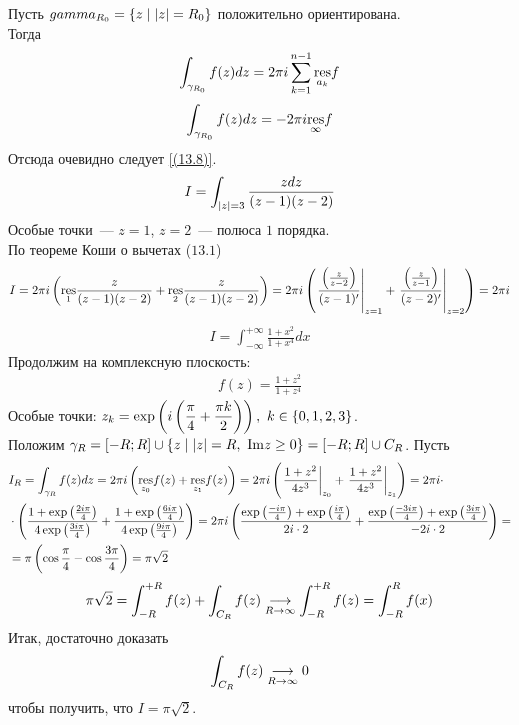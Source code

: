 Пусть $gamma_{R_0} = \{z \mid \left|{z}\right| = R_0\}$ положительно ориентирована.
\\
Тогда
\begin{align*}
  \int_{\gamma_{R_0}}f(z)dz = 2 \pi i \sum_{k=1}^{n-1} \underset{a_k}{\mathrm{res}}f
\end{align*}
\begin{align*}
  \int_{\gamma_{R_0}}f(z)dz = -2 \pi i \underset{\infty}{\mathrm{res}}f
\end{align*}
Отсюда очевидно следует \eqref{(13.8)}.
\Example
\begin{align*}
  I = \int_{\left|{z}\right| = 3}\frac{z dz}{(z-1)(z-2)}
\end{align*}
Особые точки~--- $z=1$, $z=2$~--- полюса $1$ порядка.
\\
По теореме Коши о вычетах ($13.1$)
\begin{align*}
  I = 2 \pi i \left( \underset{1}{\mathrm{res}} \frac{z}{(z-1)(z-2)} +  \underset{2}{\mathrm{res}} \frac{z}{(z-1)(z-2)}\right) = 2 \pi i \left( \left. \frac{\left( \frac{z}{z-2} \right)}{(z-1)'} \right|_{z=1} +  \left. \frac{\left( \frac{z}{z-1} \right)}{(z-2)'} \right|_{z=2} \right) = 2 \pi i
\end{align*}
\Example
\begin{align*}
  I = \int_{-\infty}^{+\infty}\frac{1+x^2}{1+x^4}dx
\end{align*}
Продолжим на комплексную плоскость:
\begin{align*}
  f(z) = \frac{1+z^2}{1+z^4}
\end{align*}
Особые точки: $z_k = \exp \left( i \left( \displaystyle \frac{\pi}{4} + \displaystyle \frac{\pi
          k}{2} \right) \right), \ k \in\{0, 1, 2, 3\}$.
\\
Положим $\gamma_R = \left[ -R;R \right] \cup \{z \mid \left|{z}\right| = R, \ \mathrm{Im} z \geq
0 \} = \left[ -R;R \right] \cup C_R$.
Пусть 
\begin{align*}
  & I_R = \int_{\gamma_R}f(z)dz = 2 \pi i \left( \underset{z_0}{\mathrm{res}} f(z) +  \underset{z_1}{\mathrm{res}} f(z)\right) = 2 \pi i \left( \left.\frac{1+z^2}{4z^3}\right|_{z_0} + \left.\frac{1+z^2}{4z^3}\right|_{z_1}\right) = 2 \pi i \cdot \\
  & \cdot \left( \frac{1+\exp\left( \frac{2i \pi}{4} \right)}{4 \exp \left( \frac{3i \pi}{4} \right)} +  \frac{1+\exp\left( \frac{6i \pi}{4} \right)}{4 \exp \left( \frac{9i \pi}{4} \right)}\right) = 2 \pi i \left( \frac{\exp\left( \frac{-i\pi}{4} \right) + \exp\left( \frac{i\pi}{4} \right)}{2 i \cdot 2} +  \frac{\exp\left( \frac{-3i\pi}{4} \right) + \exp\left( \frac{3i\pi}{4} \right)}{-2 i \cdot 2}\right) = \\
  & = \pi \left( \cos \frac{\pi}{4} - \cos \frac{3\pi}{4} \right) = \pi \sqrt{2}
\end{align*}
\begin{align*}
  \pi \sqrt{2} = \int_{-R}^{+R}f(z) + \int_{C_R}f(z) \underset{R\to \infty}{\longrightarrow} \int_{-R}^{+R} f(z) = \int_{-R}^{R}f(x)
\end{align*}
Итак, достаточно доказать
\begin{align*}
  \int_{C_R}f(z)  \underset{R\to \infty}{\longrightarrow} 0
\end{align*}
чтобы получить, что $I = \pi \sqrt{2}$.

